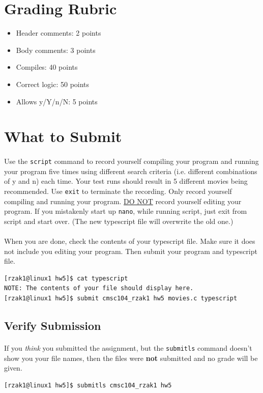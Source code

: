 \documentclass[letter,11pt]{article}
\begin{document}
\newpage
\section*{Grading Rubric}
\begin{itemize}
    \item Header comments: 2 points
    \item Body comments: 3 points
    \item Compiles: 40 points
    \item Correct logic: 50 points
    \item Allows y/Y/n/N: 5 points
\end{itemize}

\section*{What to Submit}
\paragraph{}Use the \texttt{script} command to record yourself compiling your program and running your program five times using different search criteria (i.e. different combinations of y and n) each time. Your test runs should result in 5 different movies being recommended. Use \texttt{exit} to terminate the recording. Only record yourself compiling and running your program. \underline{DO NOT} record yourself editing your program. If you mistakenly start up \texttt{nano}, while running script, just exit from script and start over. (The new typescript file will overwrite the old one.)

\paragraph{}When you are done, check the contents of your typescript file. Make sure it does not include you editing your program. Then submit your program and typescript file.
\begin{verbatim}
[rzak1@linux1 hw5]$ cat typescript
NOTE: The contents of your file should display here.
[rzak1@linux1 hw5]$ submit cmsc104_rzak1 hw5 movies.c typescript
\end{verbatim}

\subsection*{Verify Submission}
\paragraph{}If you \textit{think} you submitted the assignment, but the \texttt{submitls} command doesn't show you your file names, then the files were \textbf{not} submitted and no grade will be given.
\begin{verbatim}
[rzak1@linux1 hw5]$ submitls cmsc104_rzak1 hw5
\end{verbatim}
\end{document}
